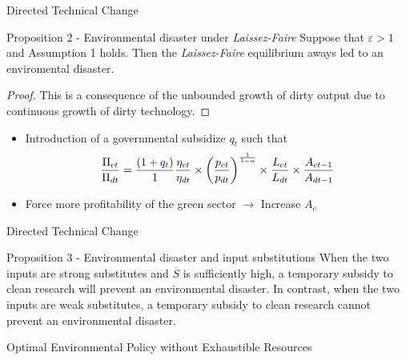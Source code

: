 \documentclass[aspectratio=169,xcolor=dvipsnames]{beamer}
\begin{document}
\begin{frame}{Directed Technical Change}
\begin{block}{Proposition 2 - Environmental disaster under \textit{Laissez-Faire}}
        Suppose that $\varepsilon>1$ and Assumption 1 holds. Then the \textit{Laissez-Faire} equilibrium aways led to an enviromental disaster. 
    \end{block}
    \begin{proof}
        This is a consequence of the unbounded growth of dirty output due to continuous growth of dirty technology.
    \end{proof}

    \begin{itemize}
        \item Introduction of a governmental subsidize $q_t$  such that 
        \begin{equation*}
        \frac{\Pi_{ct} }{\Pi_{dt} } = \frac{(\textcolor{blue}{1+q_t})}{1}\frac{\eta_{ct}}{\eta_{dt}}  \times \bigg(\frac{p_{ct}}{p_{dt}}\bigg)^{\frac{1}{1-\alpha}}  \times  \frac{ L_{ct}}{ L_{dt}} \times \frac{ A_{ct-1}}{ A_{dt-1}} 
    \end{equation*}
    \item Force more profitability of the green sector $\rightarrow$ Increase $A_c$ 
    \end{itemize}
\end{frame}

\begin{frame}{Directed Technical Change}
\begin{block}{Proposition 3 - Environmental disaster and input substitutions}
        When the two inputs are strong substitutes and $\overline{S}$ is sufficiently high, a temporary subsidy to clean research will prevent an environmental disaster. In contrast, when the two inputs are weak substitutes, a temporary subsidy to clean research cannot prevent an environmental disaster.
    \end{block}
\end{frame}

\begin{frame}{}
\centering
\Large Optimal Environmental Policy without Exhaustible Resources 
\end{frame}
\end{document}
